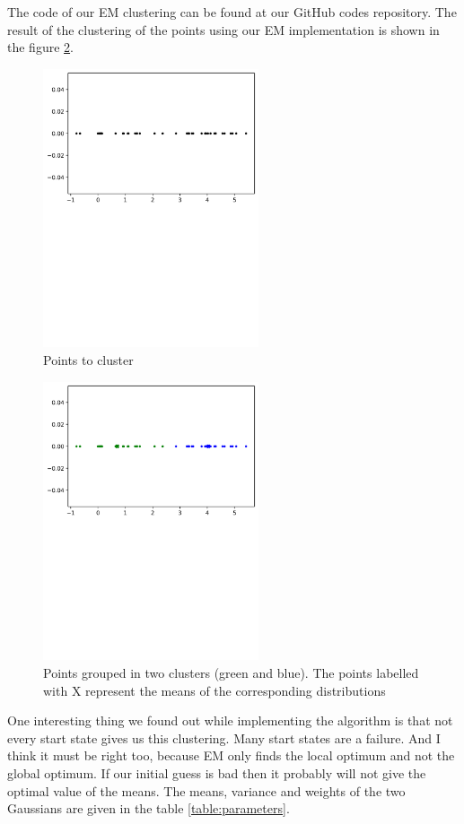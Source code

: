 \documentclass[journal, compsoc]{IEEEtran}
\begin{document}
The code of our EM clustering can be found at our GitHub codes repository. The result of the clustering of the points using our EM implementation
is shown in the figure \ref{fig:cluster}.
\begin{figure}[!h]
\centering
\includegraphics[width=2.5in]{images/points.pdf}
\caption{Points to cluster}
\label{fig:cluster}
\end{figure}
\begin{figure}[!h]
\centering
\includegraphics[width=2.5in]{images/clustered_points.pdf}
\caption{Points grouped in two clusters (green and blue). The points labelled with X represent the means of the corresponding distributions}
\label{fig:cluster}
\end{figure}

One interesting thing we found out while implementing the algorithm is that not every start state gives us this clustering. Many start states are a failure.
And I think it must be right too, because EM only finds the local optimum and not the global optimum. If our initial guess is bad then it probably will not
give the optimal value of the means. The means, variance and weights of the two Gaussians are given in the table \ref{table:parameters}.
\end{document}
